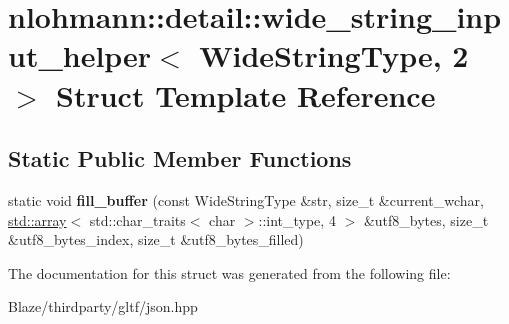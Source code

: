 \hypertarget{structnlohmann_1_1detail_1_1wide__string__input__helper_3_01WideStringType_00_012_01_4}{}\section{nlohmann\+:\+:detail\+:\+:wide\+\_\+string\+\_\+input\+\_\+helper$<$ Wide\+String\+Type, 2 $>$ Struct Template Reference}
\label{structnlohmann_1_1detail_1_1wide__string__input__helper_3_01WideStringType_00_012_01_4}
\subsection*{Static Public Member Functions}
\begin{DoxyCompactItemize}
\item 
\mbox{\label{structnlohmann_1_1detail_1_1wide__string__input__helper_3_01WideStringType_00_012_01_4_a7ede7749f186f1a6a46c08abb607fd5c}} 
static void {\bfseries fill\+\_\+buffer} (const Wide\+String\+Type \&str, size\+\_\+t \&current\+\_\+wchar, \hyperlink{namespacenlohmann_1_1detail_a1ed8fc6239da25abcaf681d30ace4985af1f713c9e000f5d3f280adbd124df4f5}{std\+::array}$<$ std\+::char\+\_\+traits$<$ char $>$\+::int\+\_\+type, 4 $>$ \&utf8\+\_\+bytes, size\+\_\+t \&utf8\+\_\+bytes\+\_\+index, size\+\_\+t \&utf8\+\_\+bytes\+\_\+filled)
\end{DoxyCompactItemize}


The documentation for this struct was generated from the following file\+:\begin{DoxyCompactItemize}
\item 
Blaze/thirdparty/gltf/json.\+hpp\end{DoxyCompactItemize}
